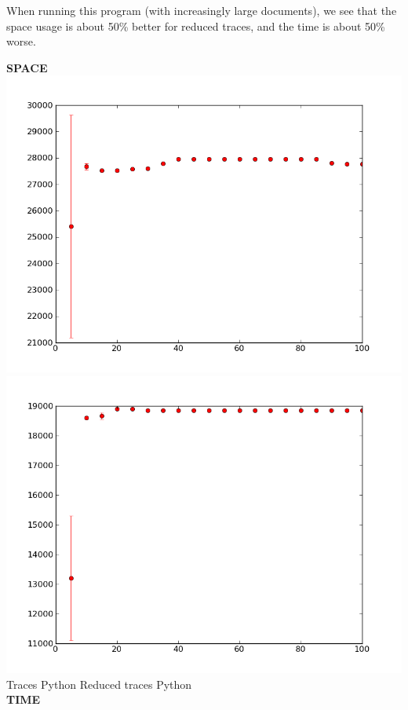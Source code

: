 \documentclass[10pt]{article}
\begin{document}
When running this program (with increasingly large documents), we see that the space usage is about 50\% better for reduced traces, and the time is about 50\% worse.
\pagebreak
\begin{center}
{\bf SPACE} \\
\includegraphics[scale=0.4]{../graphs/topic_models/topic-model-collapsed-traces-py-memory.png} 
\includegraphics[scale=0.4]{../graphs/topic_models/topic-model-collapsed-reduced-traces-py-memory.png} \\
Traces Python \qquad \qquad \qquad\qquad\qquad\qquad \qquad Reduced traces Python \\
{\bf TIME} \\

\end{center}
\end{document}
